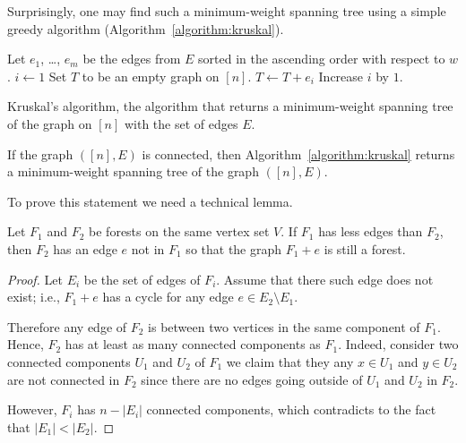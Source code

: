 Surprisingly, one may find such a minimum-weight spanning tree using a simple
greedy algorithm (Algorithm~\ref{algorithm:kruskal}).
\begin{algorithm}
  \begin{algorithmic}[1]
      \State Let $e_1$, \dots, $e_m$ be the edges from $E$ sorted in the
        ascending order with respect to $w$.
      \State $i \gets 1$
      \State Set $T$ to be an empty graph on $[n]$.
      \label{line:kruskal-while}
          \State $T \gets T + e_i$
        \EndIf
        \State Increase $i$ by $1$.
      \EndWhile
      \State {}
    \EndFunction
  \end{algorithmic}
  \caption{Kruskal's algorithm, the algorithm that returns a minimum-weight
  spanning tree of the graph on $[n]$ with the set of edges $E$.}
  \label{algorithm:kruskal}
\end{algorithm}

\begin{theorem}
\label{theorem:kruskal}
  If the graph $([n], E)$ is connected, then Algorithm~\ref{algorithm:kruskal}
  returns a minimum-weight spanning tree of the graph $([n], E)$.
\end{theorem}

To prove this statement we need a technical lemma.
\begin{lemma}
  Let $F_1$ and $F_2$ be forests on the same vertex set $V$. If $F_1$ has less
  edges than $F_2$, then $F_2$ has an edge $e$ not in $F_1$ so
  that the graph $F_1 + e$ is still a forest.
\end{lemma}
\begin{proof}
  Let $E_i$ be the set of edges of $F_i$.
  Assume that there such edge does not exist; i.e., $F_1 + e$ has a cycle for
  any edge $e \in E_2 \setminus E_1$.

  Therefore any edge of $F_2$ is between two vertices in the same component of
  $F_1$. Hence, $F_2$ has at least as many connected components as $F_1$.
  Indeed, consider two connected components $U_1$ and $U_2$ of $F_1$ we claim
  that they any $x \in U_1$ and $y \in U_2$ are not connected in $F_2$ since
  there are no edges going outside of $U_1$ and $U_2$ in $F_2$.

  However, $F_i$ has $n - |E_i|$ connected components, which contradicts to the
  fact that $|E_1| < |E_2|$.
\end{proof}

